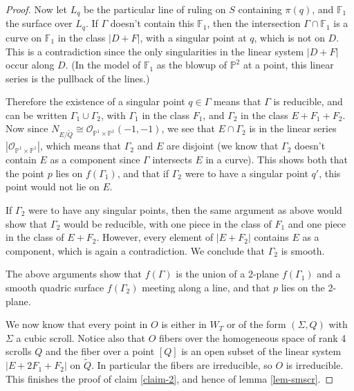 \documentclass[twoside,12pt,reqno]{amsart}
\theoremstyle{plain}
\theoremstyle{definition}
\newcommand{\FF}{\mathbb{F}}
\newcommand{\PP}{\mathbb{P}}
\def\ps{\vspace{4pt}}
\newcommand{\OO}{\mathcal O}
\begin{document}
\begin{proof}
\ps

Now let $L_q$ be the particular line of ruling on $S$ containing $\pi(q)$, and
$\FF_1$ the surface over $L_q$.  If $\Gamma$ doesn't contain this $\FF_1$, then
the intersection $\Gamma\cap\FF_1$ is a curve on $\FF_1$ in the class
$|D+F|$, with a singular point at $q$, which is not on $D$.  This is a 
contradiction since the only singularities in the linear system $|D+F|$ occur
along $D$. (In the model of $\FF_1$ as the blowup of $\PP^2$ at a point, this
linear series is the pullback of the lines.)

\ps

Therefore the existence of a singular point $q \in\Gamma$ means that $\Gamma$
is reducible, and can be written $\Gamma_1\cup\Gamma_2$, with $\Gamma_1$ in 
the class $F_1$, and $\Gamma_2$ in the class $E+F_1+F_2$.  
Now since $N_{E/\tilde{Q}}\cong \OO_{\PP^1\times \PP^1}(-1,-1)$, we see that
$E\cap\Gamma_2$ is in the linear series $|\OO_{\PP^1\times\PP^1}|$, which means
that $\Gamma_2$ and $E$ are disjoint (we know that $\Gamma_2$ doesn't contain
$E$ as a component since $\Gamma$ intersects $E$ in a curve).
This shows both that the point $p$ lies on $f(\Gamma_1)$, and that if $\Gamma_2$
were to have a singular point $q'$, this point would not lie on $E$.

\ps

If $\Gamma_2$ were
to have 
any singular points, then the same argument as above would show that 
$\Gamma_2$ would be 
reducible, with one piece in the class of $F_1$ and one piece in the class of
$E+F_2$.  However, every element of $|E+F_2|$ contains $E$ as a component, which
is again a contradiction.
We conclude that $\Gamma_2$ is smooth.

\ps

The above arguments show that 
$f(\Gamma)$ is the union of a 2-plane $f(\Gamma_1)$ and a smooth
quadric surface $f(\Gamma_2)$ meeting along a line, and that $p$ lies on the
2-plane.  

\ps

We now know that every point in $O$ is either in $W_T$ or of
the form $(\Sigma,Q)$ with $\Sigma$ a cubic scroll.  Notice also that
$O$ fibers over the homogeneous space of rank 4 scrolls $Q$ and the
fiber over a point $[Q]$ is an open subset of the linear system
$|E+2F_1+F_2|$ on $\tilde{Q}$.  In particular the fibers are
irreducible, so $O$ is irreducible.   This finishes the proof of
claim \ref{claim-2}, and hence of
lemma \ref{lem-smscr}.

\end{proof}
\end{document}
